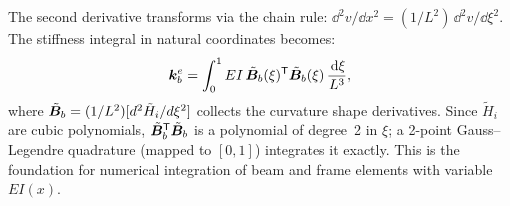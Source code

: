 The second derivative transforms via the chain rule:
$\dd^2 v/\dd x^2 = (1/L^2)\,\dd^2 v/\dd \xi^2$.
The stiffness integral in natural coordinates becomes:
\begin{equation}
    \bm{k}^e_b = \int_0^1 EI\,\tilde{\bm{B}}_b(\xi)^{\mathsf{T}}
                  \tilde{\bm{B}}_b(\xi)\,\frac{\,\mathrm{d}\xi}{L^3} ,
    \label{eq:beam_isomap}
\end{equation}
where $\tilde{\bm{B}}_b = (1/L^2)[d^2\tilde{H}_i/d\xi^2]$ collects the
curvature shape derivatives. Since $\tilde{H}_i$ are cubic polynomials,
$\tilde{\bm{B}}_b^{\mathsf{T}} \tilde{\bm{B}}_b$ is a polynomial of degree~2
in $\xi$; a 2-point Gauss--Legendre quadrature (mapped to $[0,1]$) integrates
it exactly. This is the foundation for numerical integration of beam and frame
elements with variable $EI(x)$.
